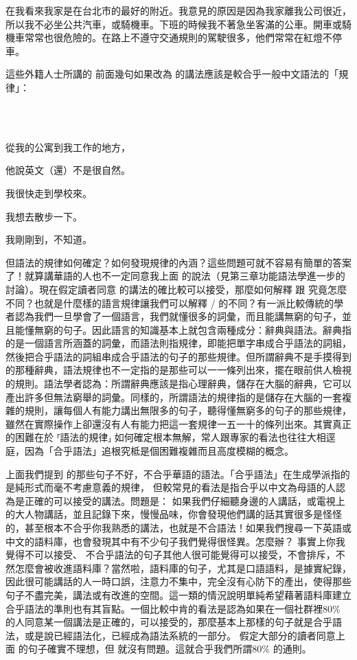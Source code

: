 在我看來我家是在台北市的最好的附近。我意見的原因是因為我家離我公司很近，所以我不必坐公共汽車，或騎機車。下班的時候我不著急坐客滿的公車。開車或騎機車常常也很危險的。在路上不遵守交通規則的駕駛很多，他們常常在紅燈不停車。

這些外籍人士所講的  前面幾句如果改為  的講法應該是較合乎一般中文語法的「規律」：

\ea%
\label{ex:key:11}
\gll\\
\\
\glt
\z

從我的公寓到我工作的地方，

他說英文（還）不是很自然。

我很快走到學校來。

我想去散步一下。

我剛剛到，不知道。

但語法的規律如何確定？如何發現規律的內涵？這些問題可就不容易有簡單的答案了！就算講華語的人也不一定同意我上面  的說法（見第三章功能語法學進一步的討論）。現在假定讀者同意  的講法的確比較可以接受，那麼如何解釋  跟  究竟怎麼不同？也就是什麼樣的語言規律讓我們可以解釋 /  的不同？有一派比較傳統的學者認為我們一旦學會了一個語言，我們就懂很多的詞彙，而且能講無窮的句子，並且能懂無窮的句子。因此語言的知識基本上就包含兩種成分：辭典與語法。辭典指的是一個語言所涵蓋的詞彙，而語法則指規律，即能把單字串成合乎語法的詞組，然後把合乎語法的詞組串成合乎語法的句子的那些規律。但所謂辭典不是手摸得到的那種辭典，語法規律也不一定指的是那些可以一一條列出來，擺在眼前供人檢視的規則。語法學者認為：所謂辭典應該是指心理辭典，儲存在大腦的辭典，它可以產出許多但無法窮舉的詞彙。同樣的，所謂語法的規律指的是儲存在大腦的一套複雜的規則，讓每個人有能力講出無限多的句子，聽得懂無窮多的句子的那些規律，雖然在實際操作上卻還沒有人有能力把這一套規律一五一十的條列出來。其實真正的困難在於 ⸢語法的規律⸥ 如何確定根本無解，常人跟專家的看法也往往大相逕庭，因為「合乎語法」追根究柢是個困難複雜而且高度模糊的概念。

上面我們提到  的那些句子不好，不合乎華語的語法。「合乎語法」在生成學派指的是純形式而毫不考慮意義的規律， 但較常見的看法是指合乎以中文為母語的人認為是正確的可以接受的講法。問題是： 如果我們仔細聽身邊的人講話，或電視上的大人物講話，並且記錄下來，慢慢品味，你會發現他們講的話其實很多是怪怪的，甚至根本不合乎你我熟悉的講法，也就是不合語法！如果我們搜尋一下英語或中文的語料庫，也會發現其中有不少句子我們覺得很怪異。怎麼辦？ 事實上你我覺得不可以接受、 不合乎語法的句子其他人很可能覺得可以接受，不會排斥，不然怎麼會被收進語料庫？當然啦，語料庫的句子，尤其是口語語料，是據實紀錄，因此很可能講話的人一時口誤，注意力不集中，完全沒有心防下的產出，使得那些句子不盡完美，講法或有改進的空間。這一類的情況說明單純希望藉著語料庫建立合乎語法的準則也有其盲點。一個比較中肯的看法是認為如果在一個社群裡80\% 的人同意某一個講法是正確的，可以接受的，那麼基本上那樣的句子就是合乎語法，或是說已經語法化，已經成為語法系統的一部分。 假定大部分的讀者同意上面  的句子確實不理想，但  就沒有問題。這就合乎我們所謂80\% 的通則。

